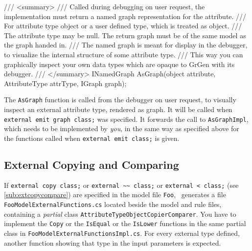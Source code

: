\begin{csharplet}
/// <summary>
/// Called during debugging on user request, the implementation must return a named graph representation for the attribute.
/// For attribute type object or a user defined type, which is treated as object.
/// The attribute type may be null. The return graph must be of the same model as the graph handed in.
/// The named graph is meant for display in the debugger, to visualize the internal structure of some attribute type.
/// This way you can graphically inspect your own data types which are opaque to GrGen with its debugger.
/// </summary>
INamedGraph AsGraph(object attribute, AttributeType attrType, IGraph graph);
\end{csharplet}

The \texttt{AsGraph} function is called from the debugger on user request, to visually inspect an external attribute type, rendered as graph.
It will be called when \texttt{external emit graph class;} was specified.
It forwards the call to \texttt{AsGraphImpl}, which needs to be implemented by \emph{you}, in the same way as specified above for the functions called when \texttt{external emit class;} is given.

\subsection*{External Copying and Comparing}\label{sub:apiextcopycompare}

If \texttt{external copy class;} or \texttt{external \textasciitilde\textasciitilde\ class;} or \texttt{external < class;} (see \ref{sub:extcopycompare}) are specified in the model file \texttt{Foo},
\GrG~generates a file \texttt{Foo\-Model\-External\-Functions.cs} located beside the model and rule files,
containing a \emph{partial} class \texttt{Attribute\-Type\-Object\-Copier\-Comparer}.
You have to implement the \texttt{Copy} or the \texttt{IsEqual} or the \texttt{IsLower} functions in the same partial class in \texttt{Foo\-Model\-External\-Functions\-Impl.cs}.
For every external type defined, another function showing that type in the input parameters is expected.

